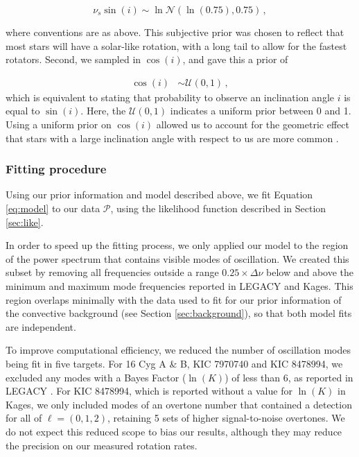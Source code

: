 \documentclass[12pt]{article}
\begin{document}
\begin{equation}
	\nu_s\sin(i) \sim \ln\mathcal{N}(\ln(0.75), 0.75)\, ,
\end{equation}

\noindent where conventions are as above. This subjective prior was chosen to reflect that most stars will have a solar-like rotation, with a long tail to allow for the fastest rotators. Second, we sampled in $\cos(i)$, and gave this a prior of

\begin{equation}
	\begin{split}
		\cos(i) &\sim \mathcal{U}(0, 1)\, ,
	\end{split}
\end{equation}
which is equivalent to stating that probability to observe an inclination angle $i$ is equal to $\sin(i)$. Here, the $\mathcal{U}(0,1)$ indicates a uniform prior between 0 and 1. Using a uniform prior on $\cos(i)$ allowed us to account for the geometric effect that stars with a large inclination angle with respect to us are more common \cite{chaplin+basu2017}.

\subsubsection{Fitting procedure}
Using our prior information and model described above, we fit Equation \ref{eq:model} to our data $\mathcal{P}$, using the likelihood function described in Section \ref{sec:like}.

In order to speed up the fitting process, we only applied our model to the region of the power spectrum that contains visible modes of oscillation. We created this subset by removing all frequencies outside a range $0.25 \times \Delta\nu$ below and above the minimum and maximum mode frequencies reported in LEGACY and Kages. This region overlaps minimally with the data used to fit for our prior information of the convective background (see Section \ref{sec:background}), so that both model fits are independent.

To improve computational efficiency, we reduced the number of oscillation modes being fit in five targets. For 16 Cyg A \& B, KIC 7970740 and KIC 8478994, we excluded any modes with a Bayes Factor ($\ln(K)$) of less than 6, as reported in LEGACY \cite{kass+raftery1995,davies+2016,lund+2017}. For KIC 8478994, which is reported without a value for $\ln(K)$ in Kages, we only included modes of an overtone number that contained a detection for all of $\ell = (0, 1, 2)$, retaining 5 sets of higher signal-to-noise overtones. We do not expect this reduced scope to bias our results, although they may reduce the precision on our measured rotation rates.
\end{document}
